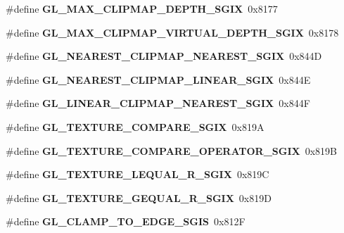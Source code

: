 \begin{DoxyCompactItemize}
\item 
\#define {\bfseries G\+L\+\_\+\+M\+A\+X\+\_\+\+C\+L\+I\+P\+M\+A\+P\+\_\+\+D\+E\+P\+T\+H\+\_\+\+S\+G\+I\+X}~0x8177\label{_s_d_l__opengl_8h_a80832eb83dc196ab91a09fa4156ba62b}

\item 
\#define {\bfseries G\+L\+\_\+\+M\+A\+X\+\_\+\+C\+L\+I\+P\+M\+A\+P\+\_\+\+V\+I\+R\+T\+U\+A\+L\+\_\+\+D\+E\+P\+T\+H\+\_\+\+S\+G\+I\+X}~0x8178\label{_s_d_l__opengl_8h_aa64a39a0be4098484d6b9bc7e11db577}

\item 
\#define {\bfseries G\+L\+\_\+\+N\+E\+A\+R\+E\+S\+T\+\_\+\+C\+L\+I\+P\+M\+A\+P\+\_\+\+N\+E\+A\+R\+E\+S\+T\+\_\+\+S\+G\+I\+X}~0x844\+D\label{_s_d_l__opengl_8h_aba9a9bb970c7d11cb0791e7f596aa2ed}

\item 
\#define {\bfseries G\+L\+\_\+\+N\+E\+A\+R\+E\+S\+T\+\_\+\+C\+L\+I\+P\+M\+A\+P\+\_\+\+L\+I\+N\+E\+A\+R\+\_\+\+S\+G\+I\+X}~0x844\+E\label{_s_d_l__opengl_8h_aa9bf16759a8aa8f8e86312a304af805f}

\item 
\#define {\bfseries G\+L\+\_\+\+L\+I\+N\+E\+A\+R\+\_\+\+C\+L\+I\+P\+M\+A\+P\+\_\+\+N\+E\+A\+R\+E\+S\+T\+\_\+\+S\+G\+I\+X}~0x844\+F\label{_s_d_l__opengl_8h_a0729f6506598058f32ee17ec60c73de3}

\item 
\#define {\bfseries G\+L\+\_\+\+T\+E\+X\+T\+U\+R\+E\+\_\+\+C\+O\+M\+P\+A\+R\+E\+\_\+\+S\+G\+I\+X}~0x819\+A\label{_s_d_l__opengl_8h_a2cfba54838052530ff8cec59b8b370a5}

\item 
\#define {\bfseries G\+L\+\_\+\+T\+E\+X\+T\+U\+R\+E\+\_\+\+C\+O\+M\+P\+A\+R\+E\+\_\+\+O\+P\+E\+R\+A\+T\+O\+R\+\_\+\+S\+G\+I\+X}~0x819\+B\label{_s_d_l__opengl_8h_a699706c40d227a888aa567c65e2c4ab1}

\item 
\#define {\bfseries G\+L\+\_\+\+T\+E\+X\+T\+U\+R\+E\+\_\+\+L\+E\+Q\+U\+A\+L\+\_\+\+R\+\_\+\+S\+G\+I\+X}~0x819\+C\label{_s_d_l__opengl_8h_a73597d96004701c3acd77b46b2e9c15d}

\item 
\#define {\bfseries G\+L\+\_\+\+T\+E\+X\+T\+U\+R\+E\+\_\+\+G\+E\+Q\+U\+A\+L\+\_\+\+R\+\_\+\+S\+G\+I\+X}~0x819\+D\label{_s_d_l__opengl_8h_a2c7515e9dcc5db444b45721131637ba1}

\item 
\#define {\bfseries G\+L\+\_\+\+C\+L\+A\+M\+P\+\_\+\+T\+O\+\_\+\+E\+D\+G\+E\+\_\+\+S\+G\+I\+S}~0x812\+F\label{_s_d_l__opengl_8h_a7ef043a00ac945f362d8084401a8c129}


\end{DoxyCompactItemize}
